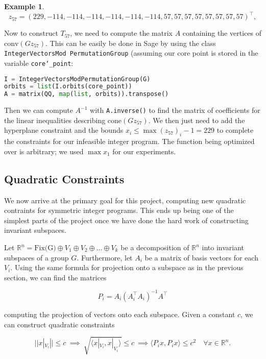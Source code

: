 \documentclass[11pt]{article} %
\theoremstyle{definition}
\newtheorem*{example}{Example}
\theoremstyle{remark}
\newcommand{\RR}{\mathbb{R}}
\newcommand{\code}[1]{\texttt{#1}}
\begin{document}
\begin{example}
\[ z_{57} = (229, -114, -114, -114, -114, -114, -114, 57, 57, 57, 57, 57, 57, 57, 57)^\intercal ,\]

Now to construct $T_{57}$, we need to compute the matrix $A$ containing the vertices of $\textrm{conv}(Gz_{57})$. This can be easily be done in Sage by using the class \code{IntegerVectorsMod\ PermutationGroup} (assuming our core point is stored in the variable \code{core\char`_point}:

\begin{lstlisting}[language = Python, frame = single]
I = IntegerVectorsModPermutationGroup(G)
orbits = list(I.orbits(core_point))
A = matrix(QQ, map(list, orbits)).transpose()
\end{lstlisting}

Then we can compute $A^{-1}$ with \code{A.inverse()} to find the matrix of coefficients for the linear inequalities describing $\textrm{cone}(Gz_{57})$. We then just need to add the hyperplane constraint and the bounds $x_i \leq \max{(z_57)_i} - 1 = 229$ to complete the constraints for our infeasible integer program. The function being optimized over is arbitrary; we used $\max{x_1}$ for our experiments.

\end{example}


\subsection{Quadratic Constraints}

We now arrive at the primary goal for this project, computing new quadratic contraints for symmetric integer programs. This ends up being one of the simplest parts of the project once we have done the hard work of constructing invariant subspaces.  

Let $\RR^n = \textrm{Fix(G)} \oplus V_1 \oplus V_2 \oplus ... \oplus V_k$ be a decomposition of $\RR^n$ into invariant subspaces of a group $G$. Furthermore, let $A_i$ be a matrix of basis vectors for each $V_i$. Using the same formula for projection onto a subspace as in the previous section, we can find the matrices 

\[ P_i = A_i(A_i^\intercal A_i)^{-1} A^\intercal \]

computing the projection of vectors onto each subspace. Given a constant $c$, we can construct quadratic constraints

\[ ||x|_{V_i}|| \leq c \ \implies \ \sqrt{\langle x|_{V_i}, x|_{V_i} \rangle} \leq c \ \implies \langle P_i x, P_i x \rangle \leq c^2 \quad  \forall x \in \RR^n.\]
\end{document}
